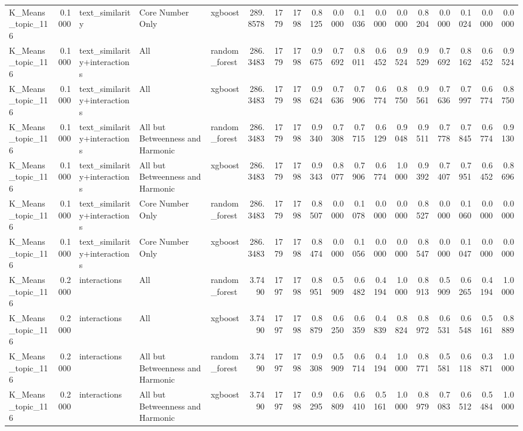 \begin{tabular}{lrlllrrrrrrrrrrrrr}
K_Means_topic_116 & 0.1000 & text_similarity & Core Number Only & xgboost & 289.8578 & 1779 & 1798 & 0.8125 & 0.0000 & 0.1036 & 0.0000 & 0.0000 & 0.8204 & 0.0000 & 0.1024 & 0.0000 & 0.0000 \\
K_Means_topic_116 & 0.1000 & text_similarity+interactions & All & random_forest & 286.3483 & 1779 & 1798 & 0.9675 & 0.7692 & 0.8011 & 0.6452 & 0.9524 & 0.9529 & 0.7692 & 0.8162 & 0.6452 & 0.9524 \\
K_Means_topic_116 & 0.1000 & text_similarity+interactions & All & xgboost & 286.3483 & 1779 & 1798 & 0.9624 & 0.7636 & 0.7906 & 0.6774 & 0.8750 & 0.9561 & 0.7636 & 0.7997 & 0.6774 & 0.8750 \\
K_Means_topic_116 & 0.1000 & text_similarity+interactions & All but Betweenness and Harmonic & random_forest & 286.3483 & 1779 & 1798 & 0.9340 & 0.7308 & 0.7715 & 0.6129 & 0.9048 & 0.9511 & 0.7778 & 0.7845 & 0.6774 & 0.9130 \\
K_Means_topic_116 & 0.1000 & text_similarity+interactions & All but Betweenness and Harmonic & xgboost & 286.3483 & 1779 & 1798 & 0.9343 & 0.8077 & 0.7906 & 0.6774 & 1.0000 & 0.9392 & 0.7407 & 0.7951 & 0.6452 & 0.8696 \\
K_Means_topic_116 & 0.1000 & text_similarity+interactions & Core Number Only & random_forest & 286.3483 & 1779 & 1798 & 0.8507 & 0.0000 & 0.1078 & 0.0000 & 0.0000 & 0.8527 & 0.0000 & 0.1060 & 0.0000 & 0.0000 \\
K_Means_topic_116 & 0.1000 & text_similarity+interactions & Core Number Only & xgboost & 286.3483 & 1779 & 1798 & 0.8474 & 0.0000 & 0.1056 & 0.0000 & 0.0000 & 0.8547 & 0.0000 & 0.1047 & 0.0000 & 0.0000 \\
K_Means_topic_116 & 0.2000 & interactions & All & random_forest & 3.7490 & 1797 & 1798 & 0.8951 & 0.5909 & 0.6482 & 0.4194 & 1.0000 & 0.8913 & 0.5909 & 0.6265 & 0.4194 & 1.0000 \\
K_Means_topic_116 & 0.2000 & interactions & All & xgboost & 3.7490 & 1797 & 1798 & 0.8879 & 0.6250 & 0.6359 & 0.4839 & 0.8824 & 0.8972 & 0.6531 & 0.6548 & 0.5161 & 0.8889 \\
K_Means_topic_116 & 0.2000 & interactions & All but Betweenness and Harmonic & random_forest & 3.7490 & 1797 & 1798 & 0.9308 & 0.5909 & 0.6714 & 0.4194 & 1.0000 & 0.8771 & 0.5581 & 0.6118 & 0.3871 & 1.0000 \\
K_Means_topic_116 & 0.2000 & interactions & All but Betweenness and Harmonic & xgboost & 3.7490 & 1797 & 1798 & 0.9295 & 0.6809 & 0.6410 & 0.5161 & 1.0000 & 0.8979 & 0.7083 & 0.6512 & 0.5484 & 1.0000 \\

\end{tabular}
